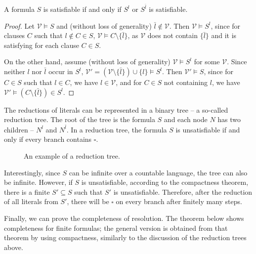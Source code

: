 \begin{lemma}
A formula $S$ is satisfiable if and only if $S^l$ or $S^{\bar{l}}$ is satisfiable.
\end{lemma}
\begin{proof}
Let $\mathcal{V} \vDash S$ and (without loss of generality) $\bar{l} \notin \mathcal{V}$. Then $\mathcal{V} \vDash S^l$, since for clauses $C$ such that $l \notin C \in S$, $\mathcal{V} \vDash C \setminus \{\bar{l}\}$, as $\mathcal{V}$ does not contain $\{\bar{l}\}$ and it is satisfying for each clause $C \in S$.

    On the other hand, assume (without loss of generality) $\mathcal{V} \vDash S^l$ for some $\mathcal{V}$. Since neither $l$ nor $\bar{l}$ occur in $S^l$, $\mathcal{V}' = (\mathcal{V} \setminus \{\bar{l}\}) \cup \{l\} \vDash S^l$. Then $\mathcal{V}' \vDash S$, since for $C \in S$ such that $l \in C$, we have $l \in \mathcal{V}$, and for $C \in S$ not containing $l$, we have $\mathcal{V}' \vDash (C \setminus \{\bar{l}\}) \in S^l$.
\end{proof}

The reductions of literals can be represented in a binary tree -- a so-called reduction tree. The root of the tree is the formula $S$ and each node $N$ has two children -- $N^l$ and $N^{\bar{l}}$. In a reduction tree, the formula $S$ is unsatisfiable if and only if every branch contains $\square$.

\begin{figure}
\centering
{}
\caption{An example of a reduction tree.}
\end{figure}

Interestingly, since $S$ can be infinite over a countable language, the tree can also be infinite. However, if $S$ is unsatisfiable, according to the compactness theorem, there is a finite $S' \subseteq S$ such that $S'$ is unsatisfiable. Therefore, after the reduction of all literals from $S'$, there will be $\square$ on every branch after finitely many steps.

Finally, we can prove the completeness of resolution. The theorem below shows completeness for finite formulas; the general version is obtained from that theorem by using compactness, similarly to the discussion of the reduction trees above.

